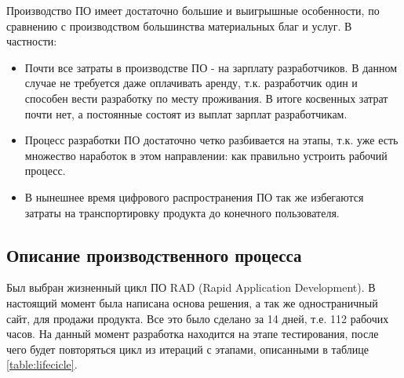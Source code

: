 Производство ПО имеет достаточно большие и выигрышные особенности, по сравнению с производством большинства материальных благ и услуг. В частности:
\begin{itemize}
	\item 
		Почти все затраты в производстве ПО - на зарплату разработчиков. В данном случае не требуется даже оплачивать аренду, т.к. разработчик один и способен вести разработку по месту проживания. В итоге косвенных затрат почти нет, а постоянные состоят из выплат зарплат разработчикам.
	\item
		Процесс разработки ПО достаточно четко разбивается на этапы, т.к. уже есть множество наработок в этом направлении: как правильно устроить рабочий процесс.
	\item
		В нынешнее время цифрового распространения ПО так же избегаются затраты на транспортировку продукта до конечного пользователя.
\end{itemize}

\subsection{Описание производственного процесса}
Был выбран жизненный цикл ПО RAD (Rapid Application Development). В настоящий момент была написана основа решения, а так же одностраничный сайт, для продажи продукта. Все это было сделано за 14 дней, т.е. 112 рабочих часов. На данный момент разработка находится на этапе тестирования, после чего будет повторяться цикл из итераций с этапами, описанными в таблице \ref{table:lifecicle}.
 
